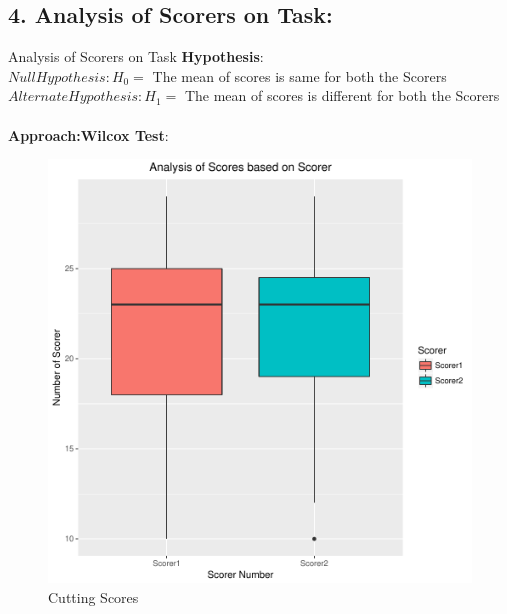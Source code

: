 \documentclass[12pt,epsf]{report}
\begin{document}
\subsection*{4. Analysis of Scorers on Task:}
 {Analysis of Scorers on Task}
\textbf{Hypothesis}:\\
$Null Hypothesis : H_0 = $ The mean of scores is same for both the Scorers\\
$Alternate Hypothesis : H_1 = $ The  mean of scores is different for both the Scorers\\
\\
\textbf{Approach:Wilcox Test}:\\
\begin{figure}[!htb]
	\begin{minipage}[c]{0.5\linewidth}
	\includegraphics[width=\linewidth]{Cutting_ScorerVsScore.pdf}
	\caption{ Cutting Scores}
	\end{minipage}
	\hfill
	\begin{minipage}[c]{0.5\linewidth}

\end{minipage}
\end{figure}
\end{document}
